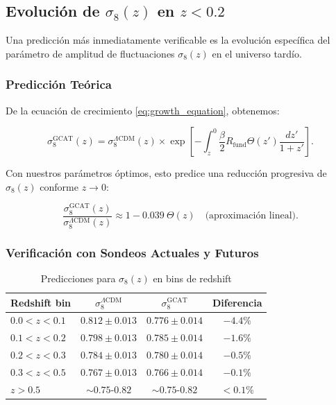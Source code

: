 \documentclass[12pt, a4paper]{article}
\theoremstyle{plain}
\theoremstyle{definition}
\begin{document}
\subsection{Evolución de $\sigma_8(z)$ en $z < 0.2$}

Una predicción más inmediatamente verificable es la evolución específica del parámetro de amplitud de fluctuaciones $\sigma_8(z)$ en el universo tardío.

\subsubsection{Predicción Teórica}

De la ecuación de crecimiento \eqref{eq:growth_equation}, obtenemos:

\begin{equation}
\sigma_8^{\mathrm{GCAT}}(z) = \sigma_8^{\Lambda\mathrm{CDM}}(z) \times 
\exp\left[-\int_z^0 \frac{\beta}{2} R_{\mathrm{fund}} \Theta(z') \frac{dz'}{1+z'}\right].
\label{eq:sigma8_evolution}
\end{equation}

Con nuestros parámetros óptimos, esto predice una reducción progresiva de $\sigma_8(z)$ conforme $z \to 0$:

\begin{equation}
\frac{\sigma_8^{\mathrm{GCAT}}(z)}{\sigma_8^{\Lambda\mathrm{CDM}}(z)} \approx 
1 - 0.039\ \Theta(z) \quad \text{(aproximación lineal)}.
\end{equation}

\subsubsection{Verificación con Sondeos Actuales y Futuros}

\begin{table}[h]
\centering
\caption{Predicciones para $\sigma_8(z)$ en bins de redshift}
\label{tab:sigma8_predictions}
\begin{tabular}{lccc}
\toprule
\textbf{Redshift bin} & $\sigma_8^{\Lambda\mathrm{CDM}}$ & $\sigma_8^{\mathrm{GCAT}}$ & \textbf{Diferencia} \\
\midrule
$0.0 < z < 0.1$ & $0.812 \pm 0.013$ & $0.776 \pm 0.014$ & $-4.4\%$ \\
$0.1 < z < 0.2$ & $0.798 \pm 0.013$ & $0.785 \pm 0.014$ & $-1.6\%$ \\
$0.2 < z < 0.3$ & $0.784 \pm 0.013$ & $0.780 \pm 0.014$ & $-0.5\%$ \\
$0.3 < z < 0.5$ & $0.767 \pm 0.013$ & $0.766 \pm 0.014$ & $-0.1\%$ \\
$z > 0.5$ & $\sim 0.75$-$0.82$ & $\sim 0.75$-$0.82$ & $< 0.1\%$ \\
\bottomrule
\end{tabular}
\end{table}
\end{document}
